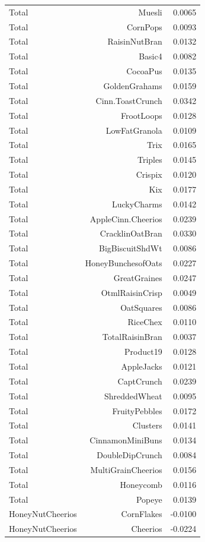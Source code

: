 \begin{longtable}{@{}lrr@{}}
Total & Muesli & 0.0065 \\
Total & CornPops & 0.0093 \\
Total & RaisinNutBran & 0.0132 \\
Total & Basic4 & 0.0082 \\
Total & CocoaPus & 0.0135 \\
Total & GoldenGrahams & 0.0159 \\
Total & Cinn.ToastCrunch & 0.0342 \\
Total & FrootLoops & 0.0128 \\
Total & LowFatGranola & 0.0109 \\
Total & Trix & 0.0165 \\
Total & Triples & 0.0145 \\
Total & Crispix & 0.0120 \\
Total & Kix & 0.0177 \\
Total & LuckyCharms & 0.0142 \\
Total & AppleCinn.Cheerios & 0.0239 \\
Total & CracklinOatBran & 0.0330 \\
Total & BigBiscuitShdWt & 0.0086 \\
Total & HoneyBunchesofOats & 0.0227 \\
Total & GreatGraines & 0.0247 \\
Total & OtmlRaisinCrisp & 0.0049 \\
Total & OatSquares & 0.0086 \\
Total & RiceChex & 0.0110 \\
Total & TotalRaisinBran & 0.0037 \\
Total & Product19 & 0.0128 \\
Total & AppleJacks & 0.0121 \\
Total & CaptCrunch & 0.0239 \\
Total & ShreddedWheat & 0.0095 \\
Total & FruityPebbles & 0.0172 \\
Total & Clusters & 0.0141 \\
Total & CinnamonMiniBuns & 0.0134 \\
Total & DoubleDipCrunch & 0.0084 \\
Total & MultiGrainCheerios & 0.0156 \\
Total & Honeycomb & 0.0116 \\
Total & Popeye & 0.0139 \\
HoneyNutCheerios & CornFlakes & -0.0100 \\
HoneyNutCheerios & Cheerios & -0.0224 \\

\end{longtable}
